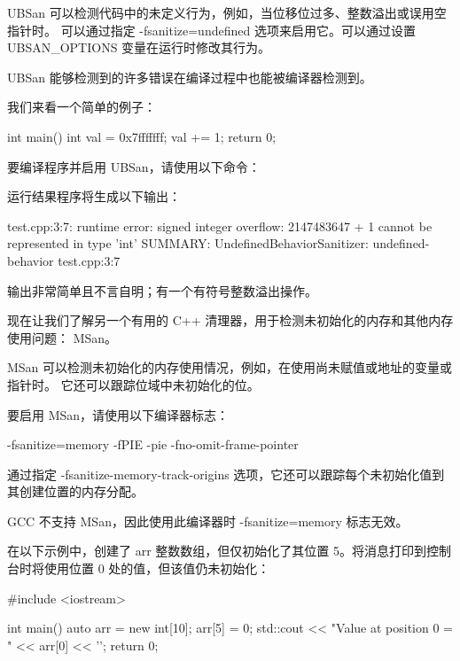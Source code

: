 UBSan 可以检测代码中的未定义行为，例如，当位移位过多、整数溢出或误用空指针时。
可以通过指定 -fsanitize=undefined 选项来启用它。可以通过设置 UBSAN\_OPTIONS 变量在运行时修改其行为。

UBSan 能够检测到的许多错误在编译过程中也能被编译器检测到。

我们来看一个简单的例子：

\begin{cpp}
int main() {
    int val = 0x7fffffff;
    val += 1;
    return 0;
}
\end{cpp}

要编译程序并启用 UBSan，请使用以下命令：


运行结果程序将生成以下输出：

\begin{shell}
test.cpp:3:7: runtime error: signed integer overflow: 2147483647 + 1
cannot be represented in type 'int'
SUMMARY: UndefinedBehaviorSanitizer: undefined-behavior test.cpp:3:7
\end{shell}

输出非常简单且不言自明；有一个有符号整数溢出操作。

现在让我们了解另一个有用的 C++ 清理器，用于检测未初始化的内存和其他内存使用问题： MSan。


MSan 可以检测未初始化的内存使用情况，例如，在使用尚未赋值或地址的变量或指针时。
它还可以跟踪位域中未初始化的位。

要启用 MSan，请使用以下编译器标志：

\begin{shell}
-fsanitize=memory -fPIE -pie -fno-omit-frame-pointer
\end{shell}

通过指定 -fsanitize-memory-track-origins 选项，它还可以跟踪每个未初始化值到其创建位置的内存分配。

GCC 不支持 MSan，因此使用此编译器时 -fsanitize=memory 标志无效。

在以下示例中，创建了 arr 整数数组，但仅初始化了其位置 5。将消息打印到控制台时将使用位置 0 处的值，但该值仍未初始化：

\begin{cpp}
#include <iostream>

int main() {
    auto arr = new int[10];
    arr[5] = 0;
    std::cout << "Value at position 0 = " << arr[0] << '\n';
    return 0;
}
\end{cpp}

